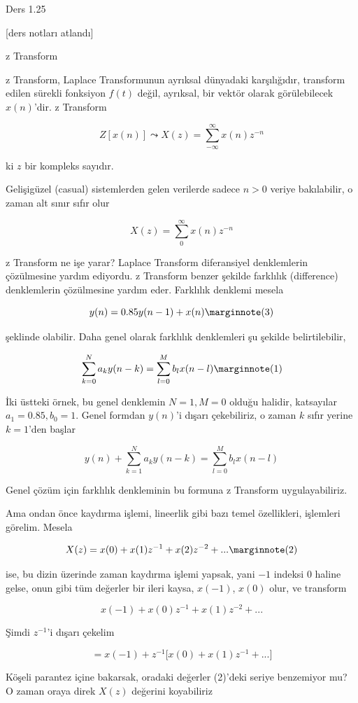 \documentclass[12pt,fleqn]{article}\usepackage{../../common}
\begin{document}
Ders 1.25

[ders notları atlandı]

z Transform 

z Transform, Laplace Transformunun ayrıksal dünyadaki karşılığıdır,
transform edilen sürekli fonksiyon $f(t)$ değil, ayrıksal, bir vektör
olarak görülebilecek $x(n)$'dir. z Transform

$$ Z[x(n)] \leadsto X(z) = \sum_{-\infty}^{\infty} x(n)z^{-n}  $$

ki $z$ bir kompleks sayıdır. 

Gelişigüzel (casual) sistemlerden gelen verilerde sadece $n>0$ veriye
bakılabilir, o zaman alt sınır sıfır olur

$$ X(z) = \sum_{0}^{\infty} x(n)z^{-n}  $$

z Transform ne işe yarar? Laplace Transform diferansiyel denklemlerin
çözülmesine yardım ediyordu. z Transform benzer şekilde farklılık
(difference) denklemlerin çözülmesine yardım eder. Farklılık denklemi
mesela

$$ y(n) = 0.85 y(n-1) + x(n) 
\mlabel{3}
$$

şeklinde olabilir. Daha genel olarak farklılık denklemleri şu şekilde
belirtilebilir,

$$ \sum_{k=0}^N a_k y(n-k) = \sum_{l=0}^M b_l x(n-l) 
\mlabel{1}
$$

İki üstteki örnek, bu genel denklemin $N=1,M=0$ olduğu halidir, katsayılar
$a_1 = 0.85,b_0=1$. Genel formdan $y(n)$'i dışarı çekebiliriz, o zaman
$k$ sıfır yerine $k=1$'den başlar

$$ y(n) + \sum_{k=1}^N a_k y(n-k) = \sum_{l=0}^M b_l x(n-l) $$

Genel çözüm için farklılık denkleminin bu formuna z Transform
uygulayabiliriz. 

Ama ondan önce kaydırma işlemi, lineerlik gibi bazı temel özellikleri,
işlemleri görelim. Mesela

$$ X(z) = x(0) + x(1)z^{-1} + x(2) z^{-2} + ... 
\mlabel{2}
$$

ise, bu dizin üzerinde zaman kaydırma işlemi yapsak, yani $-1$ indeksi
$0$ haline gelse, onun gibi tüm değerler bir ileri kaysa, $x(-1)$,
$x(0)$ olur, ve transform

$$ x(-1) + x(0)z^{-1} + x(1) z^{-2} + ...$$

Şimdi $z^{-1}$'i dışarı çekelim

$$ = x(-1) + z^{-1} \bigg[ x(0) + x(1) z^{-1} + ... \bigg] $$

Köşeli parantez içine bakarsak, oradaki değerler (2)'deki seriye benzemiyor
mu? O zaman oraya direk $X(z)$ değerini koyabiliriz
\end{document}
